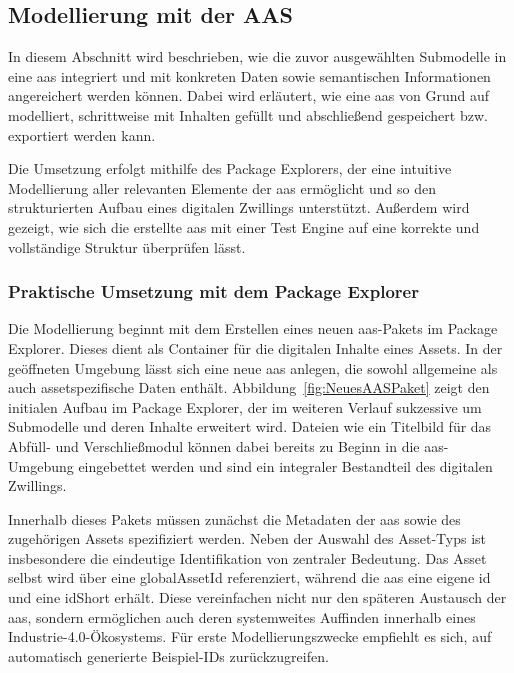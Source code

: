 \subsection{Modellierung mit der AAS}
In diesem Abschnitt wird beschrieben, wie die zuvor ausgewählten Submodelle in eine \acs{aas} integriert und mit konkreten Daten sowie semantischen Informationen angereichert werden können.
Dabei wird erläutert, wie eine \acs{aas} von Grund auf modelliert, schrittweise mit Inhalten gefüllt und abschließend gespeichert bzw. exportiert werden kann.  

Die Umsetzung erfolgt mithilfe des Package Explorers, der eine intuitive Modellierung aller relevanten Elemente der \acs{aas} ermöglicht und so den strukturierten Aufbau eines digitalen Zwillings unterstützt.
Außerdem wird gezeigt, wie sich die erstellte \acs{aas} mit einer Test Engine auf eine korrekte und vollständige Struktur überprüfen lässt.

\subsubsection{Praktische Umsetzung mit dem Package Explorer}

Die Modellierung beginnt mit dem Erstellen eines neuen \acs{aas}-Pakets im Package Explorer.
Dieses dient als Container für die digitalen Inhalte eines Assets.  
In der geöffneten Umgebung lässt sich eine neue \acs{aas} anlegen, die sowohl allgemeine als auch assetspezifische Daten enthält. 
Abbildung~\ref{fig:NeuesAASPaket} zeigt den initialen Aufbau im Package Explorer, der im weiteren Verlauf sukzessive um Submodelle und deren Inhalte erweitert wird.
Dateien wie ein Titelbild für das Abfüll- und Verschließmodul können dabei bereits zu Beginn in die \acs{aas}-Umgebung eingebettet werden und sind ein integraler Bestandteil des digitalen Zwillings.

Innerhalb dieses Pakets müssen zunächst die Metadaten der \acs{aas} sowie des zugehörigen Assets spezifiziert werden.
Neben der Auswahl des Asset-Typs ist insbesondere die eindeutige Identifikation von zentraler Bedeutung.
Das Asset selbst wird über eine globalAssetId referenziert, während die \acs{aas} eine eigene \acs{id} und eine idShort erhält.
Diese vereinfachen nicht nur den späteren Austausch der \acs{aas}, sondern ermöglichen auch deren systemweites Auffinden innerhalb eines Industrie-4.0-Ökosystems.
Für erste Modellierungszwecke empfiehlt es sich, auf automatisch generierte Beispiel-IDs zurückzugreifen.

